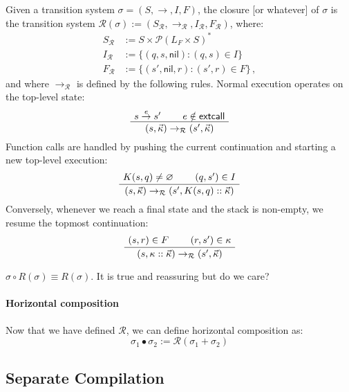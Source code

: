 \documentclass[acmsmall,10pt,review,anonymous]{acmart}
\newcommand{\kw}[1]{\ensuremath{ \textsf{#1} }}
\begin{document}
\begin{definition}
Given a transition system $\sigma = (S, \rightarrow, I, F)$,
the closure [or whatever] of $\sigma$ is the transition system
$\mathcal{R}(\sigma) :=
  (S_\mathcal{R}, \rightarrow_\mathcal{R}, I_\mathcal{R}, F_\mathcal{R})$,
where:
\begin{align*}
  S_\mathcal{R} &:= S \times \mathcal{P}(L_F \times S)^* \\
  I_\mathcal{R} &:= \{ (q, s, \kw{nil}) : (q, s) \in I \} \\
  F_\mathcal{R} &:= \{ (s', \kw{nil}, r) : (s', r) \in F \} \,,
\end{align*}
and where $\rightarrow_\mathcal{R}$ is defined
by the following rules.
Normal execution operates on the top-level state:
\[
  \AxiomC{$s \stackrel{e}{\rightarrow} s'$}
  \AxiomC{$e \notin \kw{extcall}$}
  \BinaryInfC{$(s, \vec{\kappa}) \rightarrow_\mathcal{R} (s', \vec{\kappa})$}
  \DisplayProof
\]
Function calls are handled by pushing the current continuation
and starting a new top-level execution:
\[
  \AxiomC{$K(s, q) \ne \varnothing$}
  \AxiomC{$(q, s') \in I$}
  \BinaryInfC{$(s, \vec{\kappa}) \rightarrow_\mathcal{R} (s', K(s, q) :: \vec{\kappa})$}
  \DisplayProof
\]
Conversely,
whenever we reach a final state
and the stack is non-empty,
we resume the topmost continuation:
\[
  \AxiomC{$(s, r) \in F$}
  \AxiomC{$(r, s') \in \kappa$}
  \BinaryInfC{$(s, \kappa :: \vec{\kappa}) \rightarrow_\mathcal{R} (s', \vec{\kappa})$}
  \DisplayProof
\]
\end{definition}

\begin{theorem}
$\sigma \circ R(\sigma) \equiv R(\sigma)$.
It is true and reassuring but do we care?
\end{theorem}


\paragraph{Horizontal composition} %

Now that we have defined $\mathcal{R}$,
we can define horizontal composition as:
\[
  \sigma_1 \bullet \sigma_2 := \mathcal{R}(\sigma_1 + \sigma_2)
\]



\subsection{Separate Compilation} %
\end{document}
